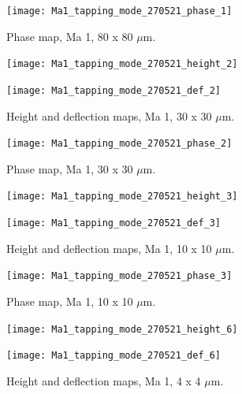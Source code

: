 \begin{figure}[H]
\centering
  \texttt{[image: Ma1\_tapping\_mode\_270521\_phase\_1]}
\caption[Phase map, Ma 1]{Phase map, Ma 1, 80 x 80 $\mu$m.}
\label{fig:afm_ma1_phase_1}
\end{figure}


\begin{figure}[H]
\centering
\begin{minipage}{.45\textwidth}
  \centering
  \texttt{[image: Ma1\_tapping\_mode\_270521\_height\_2]}
\end{minipage}
\begin{minipage}{.45\textwidth}
  \centering
  \texttt{[image: Ma1\_tapping\_mode\_270521\_def\_2]}
\end{minipage}
\caption[Height and deflection maps, Ma 1]{Height and deflection maps, Ma 1, 30 x 30 $\mu$m.}
\label{fig:afm_ma1_height_def_2}
\end{figure}

\begin{figure}[H]
\centering
  \texttt{[image: Ma1\_tapping\_mode\_270521\_phase\_2]}
\caption[Phase map, Ma 1]{Phase map, Ma 1, 30 x 30 $\mu$m.}
\label{fig:afm_ma1_phase_2}
\end{figure}


\begin{figure}[H]
\centering
\begin{minipage}{.45\textwidth}
  \centering
  \texttt{[image: Ma1\_tapping\_mode\_270521\_height\_3]}
\end{minipage}
\begin{minipage}{.45\textwidth}
  \centering
  \texttt{[image: Ma1\_tapping\_mode\_270521\_def\_3]}
\end{minipage}
\caption[Height and deflection maps, Ma 1]{Height and deflection maps, Ma 1, 10 x 10 $\mu$m.}
\label{fig:afm_ma1_height_def_3}
\end{figure}

\begin{figure}[H]
\centering
  \texttt{[image: Ma1\_tapping\_mode\_270521\_phase\_3]}
\caption[Phase map, Ma 1]{Phase map, Ma 1, 10 x 10 $\mu$m.}
\label{fig:afm_ma1_phase_3}
\end{figure}


\begin{figure}[H]
\centering
\begin{minipage}{.45\textwidth}
  \centering
  \texttt{[image: Ma1\_tapping\_mode\_270521\_height\_6]}
\end{minipage}
\begin{minipage}{.45\textwidth}
  \centering
  \texttt{[image: Ma1\_tapping\_mode\_270521\_def\_6]}
\end{minipage}
\caption[Height and deflection maps, Ma 1]{Height and deflection maps, Ma 1, 4 x 4 $\mu$m.}
\label{fig:afm_ma1_height_def_4}
\end{figure}

